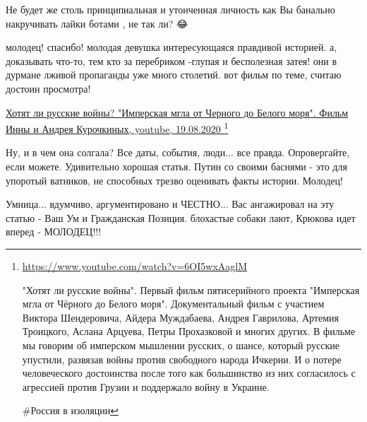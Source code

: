 \begin{itemize}
Не будет же столь принципиальная и утонченная личность как Вы банально
накручивать лайки ботами , не так ли? 😂

 

молодец! спасибо! молодая девушка интересующаяся правдивой историей. а,
доказывать что-то, тем кто за перебриком -глупая и бесполезная затея! они в
дурмане лживой пропаганды уже много столетий. вот фильм по теме, считаю достоин
просмотра! 

\href{https://www.youtube.com/watch?v=6OI5wxAaglM}{
Хотят ли русские войны? "Имперская мгла от Черного до Белого моря". Фильм Инны и Андрея Курочкиных, youtube, 19.08.2020
}\footnote{
\url{https://www.youtube.com/watch?v=6OI5wxAaglM}

"Хотят ли русские войны". Первый фильм пятисерийного проекта "Имперская мгла от
Чёрного до Белого моря".  Документальный фильм с участием Виктора Шендеровича,
Айдера Муждабаева, Андрея Гаврилова, Артемия Троицкого, Аслана Арцуева, Петры
Прохазковой и многих других. В фильме мы говорим об имперском мышлении русских,
о шансе, который русские упустили, развязав войны против свободного народа
Ичкерии. И о потере человеческого достоинства после того как большинство из них
согласилось с агрессией против Грузии и поддержало войну в Украине.

\#Россия в изоляции
}

 
Ну, и в чем она солгала? Все даты, события, люди... все правда. Опровергайте, если можете. Удивительно хорошая статья. Путин со своими баснями - это для упоротый ватников, не способных трезво оценивать факты истории. Молодец!

 
Умница... вдумчиво, аргументировано и ЧЕСТНО... Вас ангажировал на эту статью -
Ваш Ум и Гражданская Позиция. блохастые собаки лают, Крюкова идет вперед -
МОЛОДЕЦ!!!



\end{itemize}
